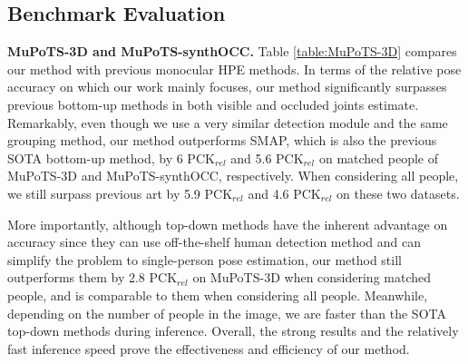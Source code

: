 \subsection{Benchmark Evaluation}
\label{sec:BenM-Eva}
\noindent\textbf{MuPoTS-3D and MuPoTS-synthOCC.}
Table \ref{table:MuPoTS-3D} compares our method with previous monocular HPE methods. In terms of the relative pose accuracy on which our work mainly focuses, our method significantly surpasses previous bottom-up methods in both visible and occluded joints estimate. Remarkably, even though we use a very similar detection module and the same grouping method, our method outperforms SMAP, which is also the previous SOTA bottom-up method, by 6 PCK$_{rel}$ and 5.6 PCK$_{rel}$ on matched people of MuPoTS-3D and MuPoTS-synthOCC, respectively. When considering all people, we still surpass previous art by 5.9 PCK$_{rel}$ and 4.6 PCK$_{rel}$ on these two datasets. 

More importantly, although top-down methods have the inherent advantage on accuracy since they can use off-the-shelf human detection method and can simplify the problem to single-person pose estimation, our method still outperforms them by 2.8 PCK$_{rel}$ on MuPoTS-3D when considering matched people, and is comparable to them when considering all people. Meanwhile, depending on the number of people in the image, we are faster than the SOTA top-down methods during inference. Overall, the strong results and the relatively fast inference speed prove the effectiveness and efficiency of our method.

